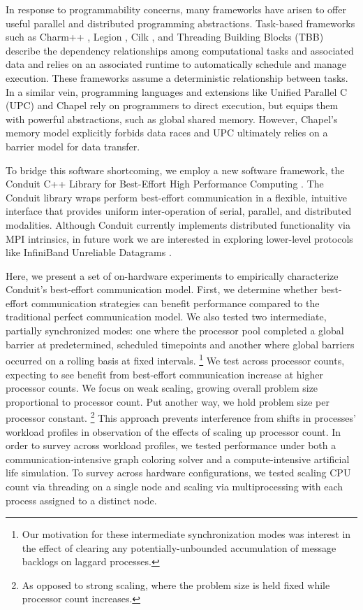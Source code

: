 In response to programmability concerns, many frameworks have arisen to offer useful parallel and distributed programming abstractions.
Task-based frameworks such as Charm++ \citep{kale1993charm++}, Legion \citep{bauer2012legion}, Cilk \citep{blumofe1996cilk}, and Threading Building Blocks (TBB) \citep{reinders2007intel} describe the dependency relationships among computational tasks and associated data and relies on an associated runtime to automatically schedule and manage execution.
These frameworks assume a deterministic relationship between tasks.
In a similar vein, programming languages and extensions like Unified Parallel C (UPC) \citep{el2006upc} and Chapel \citep{chamberlain2007parallel} rely on programmers to direct execution, but equips them with powerful abstractions, such as global shared memory.
However, Chapel's memory model explicitly forbids data races and UPC ultimately relies on a barrier model for data transfer.

To bridge this software shortcoming, we employ a new software framework, the Conduit C++ Library for Best-Effort High Performance Computing \citep{moreno2021conduit}.
The Conduit library wraps perform best-effort communication in a flexible, intuitive interface that provides uniform inter-operation of serial, parallel, and distributed modalities.
Although Conduit currently implements distributed functionality via MPI intrinsics, in future work we are interested in exploring lower-level protocols like InfiniBand Unreliable Datagrams \citep{kashyap2006ip, koop2007high}.

Here, we present a set of on-hardware experiments to empirically characterize Conduit's best-effort communication model.
First, we determine whether best-effort communication strategies can benefit performance compared to the traditional perfect communication model.
We also tested two intermediate, partially synchronized modes: one where the processor pool completed a global barrier at predetermined, scheduled timepoints and another where global barriers occurred on a rolling basis at fixed intervals.
\footnote{
Our motivation for these intermediate synchronization modes was interest in the effect of clearing any potentially-unbounded accumulation of message backlogs on laggard processes.
}
We test across processor counts, expecting to see benefit from best-effort communication increase at higher processor counts.
We focus on weak scaling, growing overall problem size proportional to processor count.
Put another way, we hold problem size per processor constant.
\footnote{
As opposed to strong scaling, where the problem size is held fixed while processor count increases.
}
This approach prevents interference from shifts in processes' workload profiles in observation of the effects of scaling up processor count.
In order to survey across workload profiles, we tested performance under both a communication-intensive graph coloring solver and a compute-intensive artificial life simulation.
To survey across hardware configurations, we tested scaling CPU count via threading on a single node and scaling via multiprocessing with each process assigned to a distinct node.

